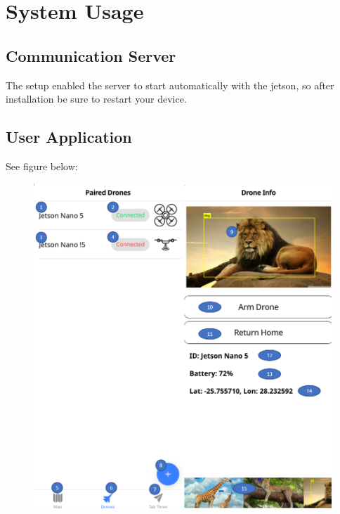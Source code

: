 \chapter{System Usage}

\section{Communication Server}

The setup enabled the server to start automatically with the jetson, so after installation be sure to restart your device.

\section{ User Application }
See figure below:
\begin{figure}[h!]
	\centering
	\includegraphics[scale=0.8]{./assets/images/screen.png}
	\label{fig: screens}
	\caption{}
\end{figure}
